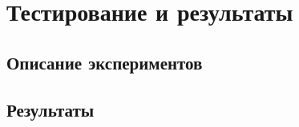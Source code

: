\FloatBarrier
\chapter{Тестирование и результаты}

\FloatBarrier
\section{Описание экспериментов}

\FloatBarrier
\section{Результаты}
